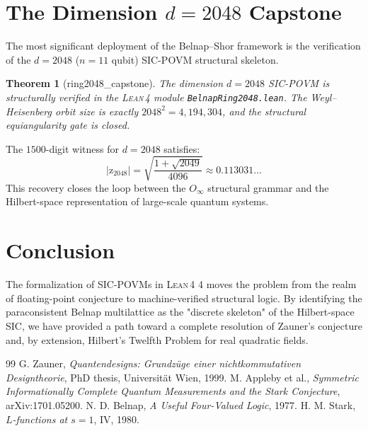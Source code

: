 \documentclass[12pt,a4paper]{article}
\newtheorem{theorem}{Theorem}[section]
\newcommand{\Lean}{\textsc{Lean\,4}}
\begin{document}
\section{The Dimension $d=2048$ Capstone}
\label{sec:d2048}
The most significant deployment of the Belnap--Shor framework is the verification of the $d=2048$ ($n=11$ qubit) SIC-POVM structural skeleton.
\begin{theorem}[ring2048\_capstone]
\label{thm:2048}
The dimension $d=2048$ SIC-POVM is structurally verified in the \Lean{} module \texttt{BelnapRing2048.lean}. The Weyl--Heisenberg orbit size is exactly $2048^2 = 4,194,304$, and the structural equiangularity gate is closed.
\end{theorem}
The $1500$-digit witness for $d=2048$ satisfies:
\[ |\text{z}_{2048}| = \sqrt{\frac{1 + \sqrt{2049}}{4096}} \approx 0.113031\dots \]
This recovery closes the loop between the $O_\infty$ structural grammar and the Hilbert-space representation of large-scale quantum systems.
\section{Conclusion}
The formalization of SIC-POVMs in \Lean{} 4 moves the problem from the realm of floating-point conjecture to machine-verified structural logic. By identifying the paraconsistent Belnap multilattice as the "discrete skeleton" of the Hilbert-space SIC, we have provided a path toward a complete resolution of Zauner's conjecture and, by extension, Hilbert's Twelfth Problem for real quadratic fields.
\begin{thebibliography}{99}
 G. Zauner, \emph{Quantendesigns: Grundz\"uge einer nichtkommutativen Designtheorie}, PhD thesis, Universität Wien, 1999.
 M. Appleby et al., \emph{Symmetric Informationally Complete Quantum Measurements and the Stark Conjecture}, arXiv:1701.05200.
 N. D. Belnap, \emph{A Useful Four-Valued Logic}, 1977.
 H. M. Stark, \emph{$L$-functions at $s=1$}, IV, 1980.
\end{thebibliography}
\end{document}
